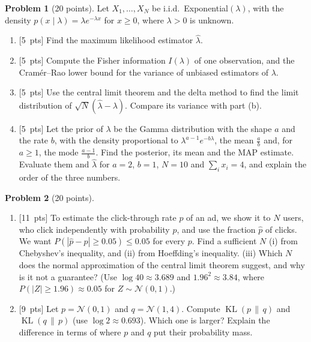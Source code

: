 \documentclass[11pt]{article}
\theoremstyle{definition}
\newtheorem{problem}{Problem}
\newcommand{\pts}[1]{\textup{[#1~pts]}}
\DeclareMathOperator{\KL}{KL}
\begin{document}
\begin{problem}[20 points]\label{pr:fin-estimation}
    Let $X_1, \ldots, X_N$ be i.i.d.\ Exponential$(\lambda)$, with the density $p(x \mid \lambda) = \lambda e^{-\lambda x}$ for $x \geq 0$, where $\lambda > 0$ is unknown.
    \begin{enumerate}[label=(\alph*)]
        \item \pts{5} Find the maximum likelihood estimator $\hat\lambda$.
        \item \pts{5} Compute the Fisher information $I(\lambda)$ of one observation, and the Cram\'er--Rao lower bound for the variance of unbiased estimators of $\lambda$.
        \item \pts{5} Use the central limit theorem and the delta method to find the limit distribution of $\sqrt{N}(\hat\lambda - \lambda)$. Compare its variance with part (b).
        \item \pts{5} Let the prior of $\lambda$ be the Gamma distribution with the shape $a$ and the rate $b$, with the density proportional to $\lambda^{a-1}e^{-b\lambda}$, the mean $\frac{a}{b}$ and, for $a \geq 1$, the mode $\frac{a - 1}{b}$. Find the posterior, its mean and the MAP estimate. Evaluate them and $\hat\lambda$ for $a = 2$, $b = 1$, $N = 10$ and $\sum_i x_i = 4$, and explain the order of the three numbers.
    \end{enumerate}
\end{problem}

\begin{problem}[20 points]\label{pr:fin-concentration-kl}
    \begin{enumerate}[label=(\alph*)]
        \item \pts{11} To estimate the click-through rate $p$ of an ad, we show it to $N$ users, who click independently with probability $p$, and use the fraction $\hat p$ of clicks. We want $P(|\hat p - p| \geq 0.05) \leq 0.05$ for every $p$. Find a sufficient $N$ (i) from Chebyshev's inequality, and (ii) from Hoeffding's inequality. (iii) Which $N$ does the normal approximation of the central limit theorem suggest, and why is it not a guarantee? (Use $\log 40 \approx 3.689$ and $1.96^2 \approx 3.84$, where $P(|Z| \geq 1.96) \approx 0.05$ for $Z \sim \mathcal{N}(0, 1)$.)
        \item \pts{9} Let $p = \mathcal{N}(0, 1)$ and $q = \mathcal{N}(1, 4)$. Compute $\KL(p \,\|\, q)$ and $\KL(q \,\|\, p)$ (use $\log 2 \approx 0.693$). Which one is larger? Explain the difference in terms of where $p$ and $q$ put their probability mass.
    \end{enumerate}
\end{problem}
\end{document}
